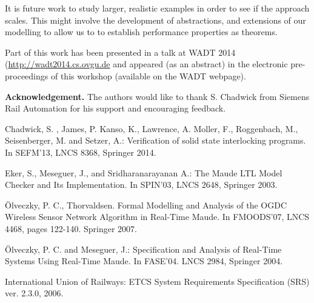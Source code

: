 \documentclass[runningheads,a4paper]{llncs}
\begin{document}
It is future work to study larger, realistic examples in order to see
if the approach scales. This might involve the development of
abstractions, and extensions of our modelling to allow us to to
establish performance properties as theorems.

Part of this work has been presented in a talk at WADT 2014
(\url{http://wadt2014.cs.ovgu.de} and appeared (as an abstract) in the
electronic pre-proceedings of this workshop (available on the WADT
webpage).

\medskip

\noindent \textbf{Acknowledgement.} 
The authors would like to thank S. Chadwick from Siemens Rail Automation for his support and encouraging feedback.

%

\begin{thebibliography}{}

 Chadwick, S. , James, P. Kanso, K., Lawrence,
  A. Moller, F., Roggenbach, M., Seisenberger, M. and Setzer, A.:
  Verification of solid state interlocking programs. In SEFM'13, LNCS 8368, Springer 2014.

 Eker, S., Meseguer, J., and
  Sridharanarayanan A.: The Maude LTL Model Checker and Its
  Implementation. In SPIN'03, LNCS 2648, Springer 2003.

 {\"O}lveczky, P. C., Thorvaldsen. Formal {M}odelling and {A}nalysis of the {OGDC} {W}ireless {S}ensor {N}etwork {A}lgorithm in {R}eal-{T}ime {M}aude.
In FMOODS'07, LNCS 4468, pages 122-140. Springer 2007.

 {\"O}lveczky, P. C. and Meseguer, J.: Specification
  and Analysis of Real-Time Systems Using {R}eal-{T}ime {M}aude. In
  FASE'04. LNCS 2984, Springer 2004.

 {International Union of Railways}: {ETCS} System Requirements Specification (SRS) ver. 2.3.0, 2006.




\end{thebibliography}
\end{document}
